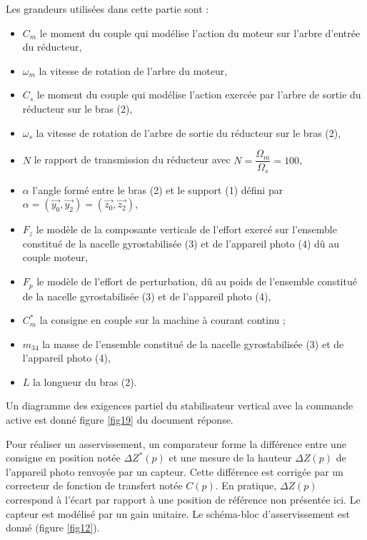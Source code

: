 Les grandeurs utilisées dans cette partie sont :
\begin{itemize}
 \item $C_m$ le moment du couple qui modélise l’action du moteur sur l’arbre d’entrée du réducteur,
 \item $\omega_m$ la vitesse de rotation de l’arbre du moteur,
 \item $C_s$ le moment du couple qui modélise l’action exercée par l’arbre de sortie du réducteur sur le bras (2),
 \item $\omega_s$ la vitesse de rotation de l’arbre de sortie du réducteur sur le bras (2),
 \item $N$ le rapport de transmission du réducteur avec $N=\dfrac{\Omega_m}{\Omega_s}=100$,
 \item $\alpha$ l’angle formé entre le bras (2) et le support (1) défini par $\alpha=(\vec{y_0},\vec{y_2})=(\vec{z_0},\vec{z_2})$,
 \item $F_z$ le modèle de la composante verticale de l’effort exercé sur l’ensemble constitué de la nacelle gyrostabilisée (3) et de l’appareil photo (4) dû au couple moteur,
 \item $F_p$ le modèle de l’effort de perturbation, dû au poids de l’ensemble constitué de la nacelle gyrostabilisée (3) et de l’appareil photo (4),
 \item $C^*_m$ la consigne en couple sur la machine à courant continu ;
 \item $m_{34}$ la masse de l’ensemble constitué de la nacelle gyrostabilisée (3) et de l’appareil photo (4),
 \item $L$ la longueur du bras (2).
\end{itemize}

Un diagramme des exigences partiel du stabilisateur vertical avec la commande active est donné figure \ref{fig19} du document réponse.


Pour réaliser un asservissement, un comparateur forme la différence entre une consigne en position notée $\Delta Z^*(p)$ et une mesure de la hauteur $\Delta Z(p)$ de l’appareil photo renvoyée par un capteur. Cette différence est corrigée par un correcteur de fonction de transfert notée $C(p)$. En pratique, $\Delta Z(p)$ correspond à l’écart par rapport
à une position de référence non présentée ici. Le capteur est modélisé par un gain unitaire. Le schéma-bloc d’asservissement est donné (figure \ref{fig12}).

